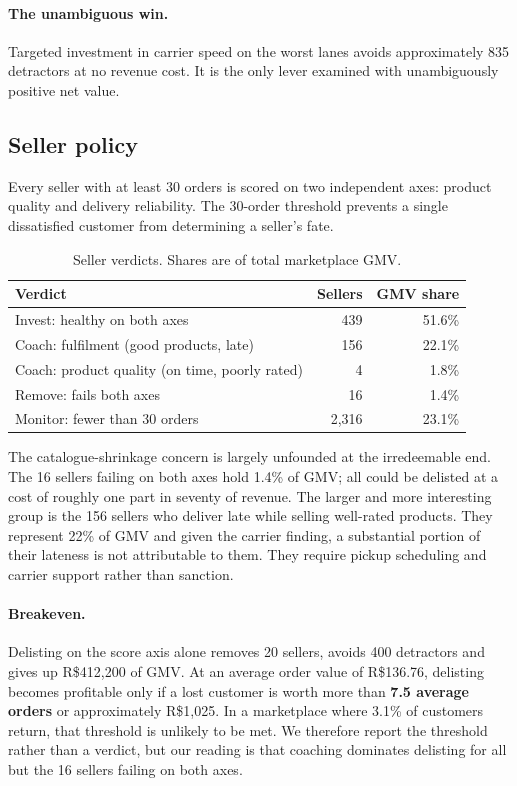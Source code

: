 \documentclass[11pt,a4paper]{article}
\newcommand{\R}{R\$}
\begin{document}
\paragraph{The unambiguous win.} Targeted investment in carrier speed on the worst
lanes avoids approximately 835 detractors at no revenue cost. It is the only lever
examined with unambiguously positive net value.

\subsection{Seller policy}

Every seller with at least 30 orders is scored on two independent axes: product
quality and delivery reliability. The 30-order threshold prevents a single
dissatisfied customer from determining a seller's fate.

\begin{table}[H]
\centering
\small
\caption{Seller verdicts. Shares are of total marketplace GMV.}
\label{tab:sellers}
\begin{tabular}{@{}lrr@{}}
\toprule
\textbf{Verdict} & \textbf{Sellers} & \textbf{GMV share}\\
\midrule
Invest: healthy on both axes & 439 & 51.6\%\\
Coach: fulfilment (good products, late) & 156 & 22.1\%\\
Coach: product quality (on time, poorly rated) & 4 & 1.8\%\\
Remove: fails both axes & 16 & 1.4\%\\
Monitor: fewer than 30 orders & 2{,}316 & 23.1\%\\
\bottomrule
\end{tabular}
\end{table}

The catalogue-shrinkage concern is largely unfounded at the irredeemable end. The
16 sellers failing on both axes hold 1.4\% of GMV; all could be delisted at a cost
of roughly one part in seventy of revenue. The larger and more interesting group is
the 156 sellers who deliver late while selling well-rated products. They represent
22\% of GMV and given the carrier finding, a substantial portion of their lateness
is not attributable to them. They require pickup scheduling and carrier support
rather than sanction.

\paragraph{Breakeven.} Delisting on the score axis alone removes 20 sellers, avoids
400 detractors and gives up \R{}412{,}200 of GMV. At an average order value of
\R{}136.76, delisting becomes profitable only if a lost customer is worth more than
\textbf{7.5 average orders} or approximately \R{}1{,}025. In a marketplace where
3.1\% of customers return, that threshold is unlikely to be met. We therefore
report the threshold rather than a verdict, but our reading is that coaching
dominates delisting for all but the 16 sellers failing on both axes.
\end{document}
